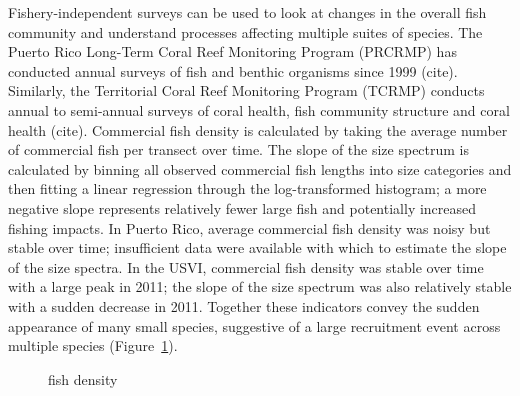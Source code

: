 \documentclass[
  letterpaper,
  oneside,
  open=any]{scrbook}
\begin{document}
Fishery-independent surveys can be used to look at changes in the
overall fish community and understand processes affecting multiple
suites of species. The Puerto Rico Long-Term Coral Reef Monitoring
Program (PRCRMP) has conducted annual surveys of fish and benthic
organisms since 1999 (cite). Similarly, the Territorial Coral Reef
Monitoring Program (TCRMP) conducts annual to semi-annual surveys of
coral health, fish community structure and coral health (cite).
Commercial fish density is calculated by taking the average number of
commercial fish per transect over time. The slope of the size spectrum
is calculated by binning all observed commercial fish lengths into size
categories and then fitting a linear regression through the
log-transformed histogram; a more negative slope represents relatively
fewer large fish and potentially increased fishing impacts. In Puerto
Rico, average commercial fish density was noisy but stable over time;
insufficient data were available with which to estimate the slope of the
size spectra. In the USVI, commercial fish density was stable over time
with a large peak in 2011; the slope of the size spectrum was also
relatively stable with a sudden decrease in 2011. Together these
indicators convey the sudden appearance of many small species,
suggestive of a large recruitment event across multiple species
(Figure~\ref{fig-fishdensity}).

\begin{figure}


\caption{\label{fig-fishdensity}fish density}

\end{figure}%
\end{document}

